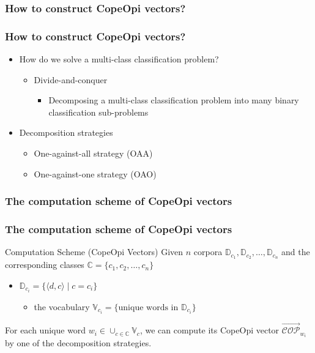\documentclass[mathserif]{beamer}
\DeclareMathOperator*{\where}{|}
\begin{document}
\subsubsection{How to construct CopeOpi vectors?}
\begin{frame}
\frametitle{How to construct CopeOpi vectors?}
\begin{itemize}
\item How do we solve a multi-class classification problem?
	\begin{itemize}
	\item Divide-and-conquer
		\begin{itemize}
		\item Decomposing a multi-class classification problem into many binary classification sub-problems
		\end{itemize}
	\end{itemize}
\item Decomposition strategies
	\begin{itemize}
	\item One-against-all strategy (OAA)
	\item One-against-one strategy (OAO)
	\end{itemize}
\end{itemize}
\end{frame}
\subsubsection{The computation scheme of CopeOpi vectors}
\begin{frame}
\frametitle{The computation scheme of CopeOpi vectors}
\begin{block}{Computation Scheme (CopeOpi Vectors)}
Given $n$ corpora $\mathbb{D}_{c_1},\mathbb{D}_{c_2},\dots,\mathbb{D}_{c_n}$ and the corresponding classes $\mathbb{C}=\{c_1,c_2,\dots,c_n\}$
\begin{itemize}
\item $\mathbb{D}_{c_i}=\{\langle d,c \rangle \where c=c_i\}$
	\begin{itemize}
	\item the vocabulary $\mathbb{V}_{c_i}=\{\text{unique words in }\mathbb{D}_{c_i}\}$
	\end{itemize}
\end{itemize}
For each unique word $w_i \in \cup_{c \in \mathbb{C}} \mathbb{V}_{c}$, we can compute its CopeOpi vector $\overrightarrow{\mathcal{COP}}_{w_i}$ by one of the decomposition strategies.
\end{block}
\end{frame}
\end{document}
